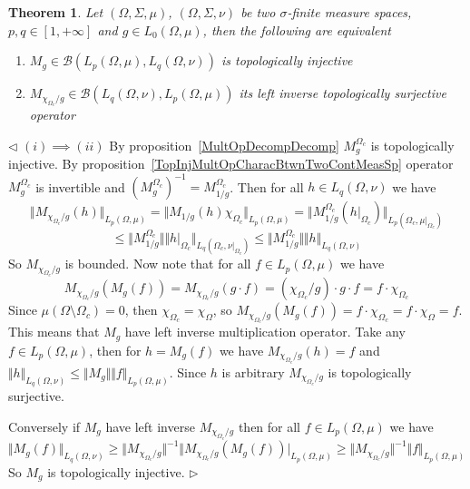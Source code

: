 \documentclass[12pt]{article}
\newtheorem{theorem}{Theorem}[subsection]
\newenvironment{proof}{\par $\triangleleft$}{$\triangleright$}
\begin{document}
\begin{theorem}\label{TopInjMultOpDescBtwnTwoMeasSp}
    Let $(\Omega,\Sigma,\mu)$, $(\Omega,\Sigma,\nu)$ be two $\sigma$-finite
    measure spaces, $p,q\in[1,+\infty]$ and $g\in L_0(\Omega,\mu)$, then
    the following are equivalent
    \begin{enumerate}[label = (\roman*)]
        \item $M_g\in\mathcal{B}(L_p(\Omega,\mu),L_q(\Omega,\nu))$ is
              topologically injective

        \item $M_{\chi_{\Omega_c}/g}\in
                  \mathcal{B}(L_q(\Omega,\nu), L_p(\Omega,\mu))$ its left inverse
              topologically surjective operator
    \end{enumerate}
\end{theorem}
\begin{proof}
    $(i)\implies (ii)$ By proposition~\ref{MultOpDecompDecomp}
    $M_g^{\Omega_c}$ is topologically injective. By
    proposition~\ref{TopInjMultOpCharacBtwnTwoContMeasSp} operator
    $M_g^{\Omega_c}$ is invertible and
    ${(M_g^{\Omega_c})}^{-1}=M_{1/g}^{\Omega_c}$. Then for
    all $h\in L_q(\Omega,\nu)$ we have
    $$
        \Vert M_{\chi_{\Omega_c}/g}(h)\Vert_{L_p(\Omega,\mu)}= \Vert
        M_{1/g}(h)\chi_{\Omega_c}\Vert_{L_p(\Omega,\mu)}= \Vert
        M_{1/g}^{\Omega_c}(h|_{\Omega_c})\Vert_{L_p(\Omega_c,\mu|_{\Omega_c})}
    $$
    $$
        \leq\Vert M_{1/g}^{\Omega_c}\Vert\Vert
        h|_{\Omega_c}\Vert_{L_q(\Omega_c,\nu|_{\Omega_c})} \leq\Vert
        M_{1/g}^{\Omega_c}\Vert\Vert h\Vert_{L_q(\Omega,\nu)}
    $$
    So $M_{\chi_{\Omega_c}/g}$ is bounded. Now note that for
    all $f\in L_p(\Omega,\mu)$ we have
    $$
        M_{\chi_{\Omega_c}/g}(M_g(f)) =M_{\chi_{\Omega_c}/g}(g\cdot f)
        =(\chi_{\Omega_c}/g)\cdot g\cdot f =f\cdot\chi_{\Omega_c}
    $$
    Since $\mu(\Omega\setminus\Omega_c)=0$, then
    $\chi_{\Omega_c}=\chi_{\Omega}$, so
    $M_{\chi_{\Omega_c}/g}(M_g(f))=f\cdot\chi_{\Omega_c}=f\cdot\chi_{\Omega}=f$.
    This means that $M_g$ have left inverse multiplication operator. Take
    any $f\in L_p(\Omega,\mu)$, then for $h=M_g(f)$ we have
    $M_{\chi_{\Omega_c}/g}(h)=f$ and
    $\Vert h\Vert_{L_q(\Omega,\nu)}
        \leq\Vert M_g\Vert\Vert f\Vert_{L_p(\Omega,\mu)}$. Since $h$ is
    arbitrary $M_{\chi_{\Omega_c}/g}$ is topologically surjective.

    Conversely if $M_g$ have left inverse $M_{\chi_{\Omega_c}/g}$
    then for all $f\in L_p(\Omega,\mu)$ we have
    $$
        \Vert M_g(f)\Vert_{L_q(\Omega,\nu)} \geq\Vert
        M_{\chi_{\Omega_c}/g}\Vert^{-1}\Vert
        M_{\chi_{\Omega_c}/g}(M_g(f))\vert_{L_p(\Omega,\mu)} \geq\Vert
        M_{\chi_{\Omega_c}/g}\Vert^{-1}\Vert f\Vert_{L_p(\Omega,\mu)}
    $$
    So $M_g$ is topologically injective.
\end{proof}
\end{document}
